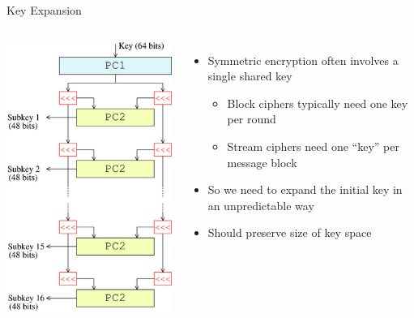 \documentclass[ignorenonframetext,]{beamer}
\providecommand{\tightlist}{%
  \setlength{\itemsep}{0pt}\setlength{\parskip}{0pt}}
\newcommand{\columnsbegin}{\begin{columns}}
\newcommand{\columnsend}{\end{columns}}
\begin{document}
\begin{frame}{Key Expansion}

\columnsbegin


\begin{center}
\includegraphics[height=0.8\textheight]{images/DES-key-schedule.png}
\end{center}


\begin{itemize}
\tightlist
\item
  Symmetric encryption often involves a single shared key

  \begin{itemize}
  \tightlist
  \item
    Block ciphers typically need one key per round
  \item
    Stream ciphers need one ``key'' per message block
  \end{itemize}
\item
  So we need to \alert{expand} the initial key in an unpredictable way
\item
  Should preserve size of key space
\end{itemize}

\columnsend

\end{frame}
\end{document}
